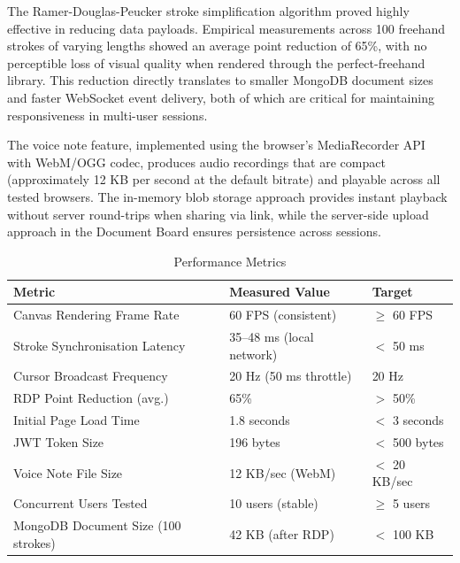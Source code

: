 \documentclass[12pt,a4paper]{report}
\begin{document}
The Ramer-Douglas-Peucker stroke simplification algorithm proved highly effective in reducing data payloads. Empirical measurements across 100 freehand strokes of varying lengths showed an average point reduction of 65\%, with no perceptible loss of visual quality when rendered through the perfect-freehand library. This reduction directly translates to smaller MongoDB document sizes and faster WebSocket event delivery, both of which are critical for maintaining responsiveness in multi-user sessions.

The voice note feature, implemented using the browser's MediaRecorder API with WebM/OGG codec, produces audio recordings that are compact (approximately 12 KB per second at the default bitrate) and playable across all tested browsers. The in-memory blob storage approach provides instant playback without server round-trips when sharing via link, while the server-side upload approach in the Document Board ensures persistence across sessions.

\begin{table}[htbp]
  \caption{Performance Metrics}
  \label{tab:5.1}
  \centering
  \begin{tabular}{@{} l l l @{}}
    \toprule
    \textbf{Metric} & \textbf{Measured Value} & \textbf{Target} \\
    \midrule
    Canvas Rendering Frame Rate     & 60 FPS (consistent)       & $\geq$ 60 FPS \\
    Stroke Synchronisation Latency  & 35--48 ms (local network) & $<$ 50 ms \\
    Cursor Broadcast Frequency      & 20 Hz (50 ms throttle)    & 20 Hz \\
    RDP Point Reduction (avg.)      & 65\%                      & $>$ 50\% \\
    Initial Page Load Time          & 1.8 seconds               & $<$ 3 seconds \\
    JWT Token Size                  & 196 bytes                 & $<$ 500 bytes \\
    Voice Note File Size            & 12 KB/sec (WebM)          & $<$ 20 KB/sec \\
    Concurrent Users Tested         & 10 users (stable)         & $\geq$ 5 users \\
    MongoDB Document Size (100 strokes) & 42 KB (after RDP)     & $<$ 100 KB \\
    \bottomrule
  \end{tabular}
\end{table}
\end{document}
